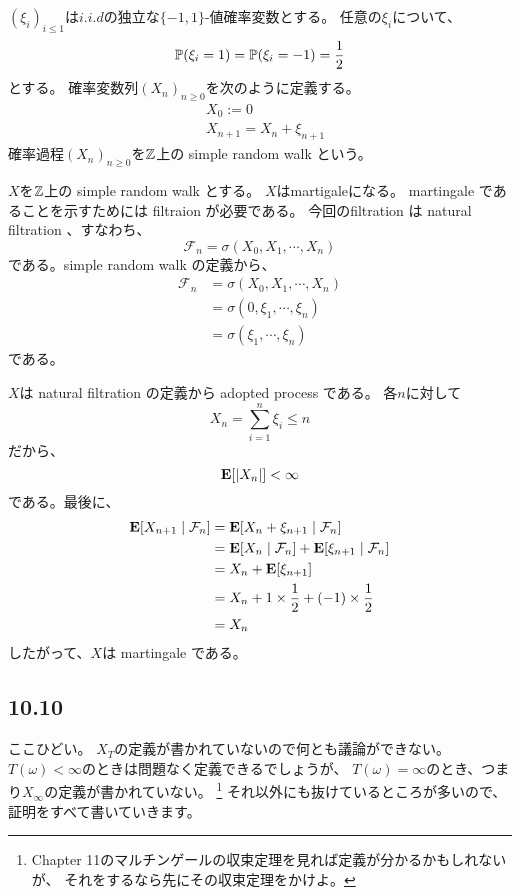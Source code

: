         \begin{def*}
          $(\xi_i)_{i \leq 1}$は$i.i.d$の独立な$\{-1, 1\}$-値確率変数とする。
          任意の$\xi_i$について、
          \[
            {\mathbb{P}}(\xi_i = 1) = {\mathbb{P}}(\xi_i = -1) = \frac{1}{2}
          \]
          とする。
          確率変数列$(X_n)_{n \ge 0}$を次のように定義する。
          \begin{align*}
            &X_0 := 0 \\
            &X_{n+1} = X_n + \xi_{n+1}
          \end{align*}
          確率過程$(X_n)_{n \ge 0}$を${\mathbb{Z}}$上の simple random walk という。
        \end{def*}

        $X$を${\mathbb{Z}}$上の simple random walk とする。
        $X$はmartigaleになる。
        martingale であることを示すためには filtraion が必要である。
        今回のfiltration は natural filtration 、すなわち、
        \[
          \mathcal{F}_n = \sigma(X_0,X_1, \cdots , X_n)
        \]
        である。simple random walk の定義から、
        \begin{align*}
          \mathcal{F}_n &= \sigma(X_0,X_1, \cdots , X_n)\\
          &= \sigma(0, \xi_1, \cdots ,\xi_n) \\
          &= \sigma(\xi_1, \cdots ,\xi_n)
        \end{align*}
        である。

        $X$は natural filtration の定義から adopted process である。
        各$n$に対して
        \[
          X_n = \sum_{i = 1}^{n} \xi_i \leq n
        \]
        だから、
        \[
          {\mathbf{E}}[|X_n|] < \infty
        \]
        である。最後に、
        \begin{align*}
          {\mathbf{E}}[X_{n+1} \mid \mathcal{F}_n] &= {\mathbf{E}}[X_{n} + \xi_{n + 1} \mid \mathcal{F}_n]\\
          &= {\mathbf{E}}[X_{n} \mid \mathcal{F}_n] + {\mathbf{E}}[\xi_{n + 1} \mid \mathcal{F}_n] \\
          &= X_{n} + {\mathbf{E}}[\xi_{n + 1}] \\
          &= X_{n} + 1 \times \frac{1}{2} + (-1) \times \frac{1}{2}\\
          &= X_{n}
        \end{align*}
        したがって、$X$は martingale である。

    \subsection{10.10}
      ここひどい。
      $X_T$の定義が書かれていないので何とも議論ができない。
      $T(\omega) < \infty$のときは問題なく定義できるでしょうが、
      $T(\omega) = \infty$のとき、つまり$X_{\infty}$の定義が書かれていない。
      \footnote{Chapter 11のマルチンゲールの収束定理を見れば定義が分かるかもしれないが、
      それをするなら先にその収束定理をかけよ。}
      それ以外にも抜けているところが多いので、
      証明をすべて書いていきます。

